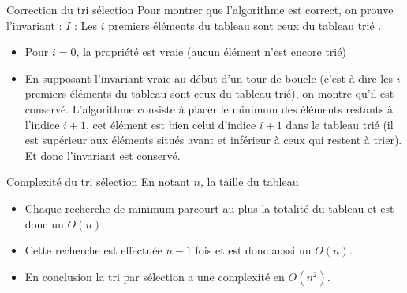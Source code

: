 \documentclass[10pt]{beamer}
\begin{document}
\begin{frame}[fragile]{\Ctitle}{\stitle}
	\begin{exampleblock}{Correction du tri sélection}
		\textcolor{OliveGreen}{Pour montrer que l'algorithme est correct, on prouve  l'invariant : $I$ : \og{}  Les $i$ premiers éléments du tableau sont ceux du tableau trié \fg{}.}
		\begin{itemize}
			\item<2->\textcolor{OliveGreen}{Pour $i=0$, la propriété est vraie (aucun élément n'est encore trié)}
			\item<3->\textcolor{OliveGreen}{En supposant l'invariant vraie au début d'un tour de boucle (c'est-à-dire les $i$ premiers éléments du tableau sont ceux du tableau trié), on montre qu'il est conservé. L'algorithme consiste à placer le minimum des éléments restants à l'indice $i+1$, cet élément est bien celui d'indice $i+1$ dans le tableau trié (il est supérieur aux éléments situés avant et inférieur à ceux qui restent à trier). Et donc l'invariant est conservé.}
		\end{itemize}
	\end{exampleblock}
\end{frame}

\begin{frame}[fragile]{\Ctitle}{\stitle}
	\begin{exampleblock}{Complexité du tri sélection}
		En notant $n$, la taille du tableau
		\begin{itemize}
			\item<1-> Chaque recherche de minimum parcourt au plus la totalité du tableau et est donc un $O(n)$.
			\item<2-> Cette recherche est effectuée $n-1$ fois et est donc aussi un $O(n)$.
			\item<3-> En conclusion la tri par sélection a une complexité en $O(n^2)$.
		\end{itemize}
	\end{exampleblock}
\end{frame}
\end{document}
